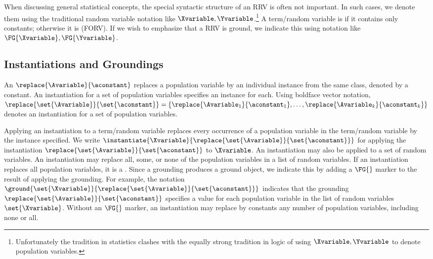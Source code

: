 \documentclass{article}
\begin{document}
When discussing general statistical concepts, the special syntactic structure of an RRV is often not important. In such cases, we denote them 
using the traditional random variable notation like $\Xvariable,\Yvariable$.\footnote{Unfortunately the tradition in statistics clashes with the equally strong tradition in logic of using $\Xvariable,\Yvariable$ to denote population variables.} 
%
A term/random variable is  if it contains only constants; otherwise it is  (FORV). If we wish to emphasize that a RRV is ground, we indicate this using notation like $\FG{\Xvariable},\FG{\Yvariable}$.

\subsection{Instantiations and Groundings}


An  $\replace{\Avariable}{\aconstant}$ replaces a population variable by an individual instance  from the same class, denoted by a constant. An instantiation for a set of population variables specifies an instance for each. Using boldface vector notation,
$\replace{\set{\Avariable}}{\set{\aconstant}} = \{\replace{\Avariable_{1}}{\aconstant_{1}},\ldots,\replace{\Avariable_{k}}{\aconstant_{k}}\}$ 
denotes an instantiation for a set of population variables.

Applying an instantiation to a term/random variable replaces every occurrence of a population variable in the term/random variable by the instance specified. We write 
$\instantiate
	{\Xvariable}
	{\replace{\set{\Avariable}}{\set{\aconstant}}}
$ for applying the instantiation $\replace{\set{\Avariable}}{\set{\aconstant}}$ to $\Xvariable$. An instantiation may also be applied to a set of random variables. 
%
An instantiation may replace all, some, or none of the population variables in a list of random variables. If an instantiation replaces all population variables, it is a . Since a grounding produces a ground object, we indicate this by adding a $\FG{}$ marker to the result of applying the grounding. For example, the notation $\ground{\set{\Xvariable}}{\replace{\set{\Avariable}}{\set{\aconstant}}}$ indicates that the grounding $\replace{\set{\Avariable}}{\set{\aconstant}}$ specifies a value for each population variable in the list of random variables $\set{\Xvariable}$. Without an $\FG{}$ marker, an instantiation may replace by constants any number of population variables, including none or all.
\end{document}
